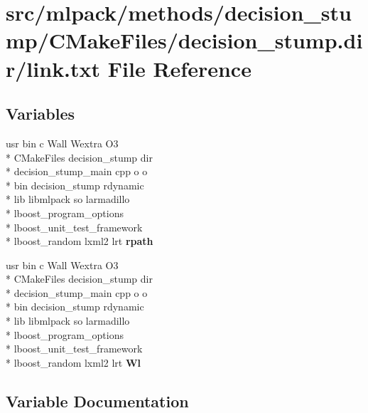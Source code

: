 \section{src/mlpack/methods/decision\-\_\-stump/\-C\-Make\-Files/decision\-\_\-stump.dir/link.txt File Reference}
\label{methods_2decision__stump_2CMakeFiles_2decision__stump_8dir_2link_8txt}
\subsection*{Variables}
\begin{DoxyCompactItemize}
\item 
usr bin c Wall Wextra O3 \\*
C\-Make\-Files decision\-\_\-stump dir \\*
decision\-\_\-stump\-\_\-main cpp o o \\*
bin decision\-\_\-stump rdynamic \\*
lib libmlpack so larmadillo \\*
lboost\-\_\-program\-\_\-options \\*
lboost\-\_\-unit\-\_\-test\-\_\-framework \\*
lboost\-\_\-random lxml2 lrt {\bf rpath}
\item 
usr bin c Wall Wextra O3 \\*
C\-Make\-Files decision\-\_\-stump dir \\*
decision\-\_\-stump\-\_\-main cpp o o \\*
bin decision\-\_\-stump rdynamic \\*
lib libmlpack so larmadillo \\*
lboost\-\_\-program\-\_\-options \\*
lboost\-\_\-unit\-\_\-test\-\_\-framework \\*
lboost\-\_\-random lxml2 lrt {\bf Wl}
\end{DoxyCompactItemize}


\subsection{Variable Documentation}
